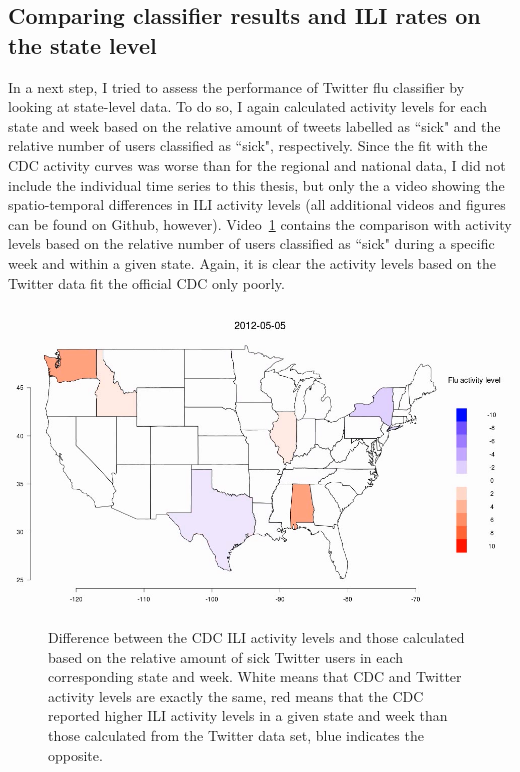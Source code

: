 \documentclass[11pt, a4paper,twoside]{report}\usepackage[]{graphicx}\usepackage[]{color}
\begin{document}
\subsection{Comparing classifier results and ILI rates on the state level}
\label{sec:comp_cdc_state}
In a next step, I tried to assess the performance of Twitter flu classifier by looking at state-level data. To do so, I again calculated activity levels for each state and week based on the relative amount of tweets labelled as ``sick" and the relative number of users classified as ``sick", respectively. Since the fit with the CDC activity curves was worse than for the regional and national data, I did not include the individual time series to this thesis, but only the a video showing the spatio-temporal differences in ILI activity levels (all additional videos and figures can be found on Github, however). Video~\ref{fig:cdc_twitter_comp_state} contains the comparison with activity levels based on the relative number of users classified as ``sick" during a specific week and within a given state. Again, it is clear the activity levels based on the Twitter data fit the official CDC only poorly.
\vspace{-0.4in}
\begin{center}
\href{run:vids/4_cdc_twitter_diff_user_state.avi}{\includegraphics[width=0.9\linewidth]{vids/4_cdc_twitter_diff_user_state.png}}
\end{center}
\vspace{-0.2in}
\begin{figure}[htbp!]
\centering
  \caption{Difference between the CDC ILI activity levels and those calculated based on the relative amount of sick Twitter users in each corresponding state and week. White means that CDC and Twitter activity levels are exactly the same, red means that the CDC reported higher ILI activity levels in a given state and week than those calculated from the Twitter data set, blue indicates the opposite.}
    \label{fig:cdc_twitter_comp_state}
\end{figure}
\end{document}
